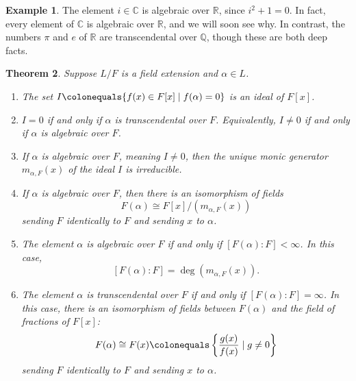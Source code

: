 \documentclass[12pt]{report}
\newtheorem{theorem}{Theorem}[chapter]
\numberwithin{equation}{section}
\numberwithin{theorem}{chapter}
\theoremstyle{definition}
\newtheorem{example}[theorem]{Example}
\newtheorem*{basic properties}{Basic Properties}
\newtheorem*{Important Remark}{Important Remark}
\newcommand{\C}{\mathbb{C}}
\begin{document}
\begin{example}
The element $i \in \C$ is algebraic over $\mathbb{R}$, since $i^2+1=0$. In fact, every element of $\C$ is algebraic over $\mathbb{R}$, and we will soon see why. In contrast, the numbers $\pi$ and $e$ of $\mathbb{R}$ are transcendental over $\mathbb{Q}$, though these are both deep facts.
\end{example}




\begin{theorem}\label{thm algebraic vs transcendental elements}  
Suppose $L/F$ is a field extension and $\alpha \in L$.
\begin{enumerate}[label=(\arabic*)]
\item The set $I \colonequals \{f(x) \in F[x] \mid f(\alpha) = 0\}$ is an ideal of $F[x]$.
\item $I = 0$ if and only if $\alpha$ is transcendental over $F$. Equivalently, $I \neq 0$ if and only if $\alpha$ is algebraic over $F$.
\item If $\alpha$ is algebraic over $F$, meaning $I \neq 0$, then the unique monic generator $m_{\alpha, F}(x)$ of the ideal $I$ is irreducible.
\item If $\alpha$ is algebraic over $F$, then there is an isomorphism of fields
$$F(\alpha)  \cong  F[x]/(m_{\alpha, F}(x))$$
sending $F$ identically to $F$ and sending $x$ to $\alpha$.
\item The element $\alpha$ is algebraic over $F$ if and only if $[F(\alpha): F] < \infty$. In this case,
$$[F(\alpha): F] = \deg(m_{\alpha, F}(x)).$$
\item The element $\alpha$ is transcendental over $F$ if and only if $[F(\alpha): F] = \infty$. In this case, there is an isomorphism of fields between $F(\alpha)$ and the field of fractions of $F[x]$:
$$F(\alpha) \cong F(x) \colonequals \left\lbrace\frac{g(x)}{f(x)}\mid  g \neq 0 \right\rbrace$$
sending $F$ identically to $F$ and sending $x$ to $\alpha$.
\end{enumerate}
\end{theorem}
\end{document}
